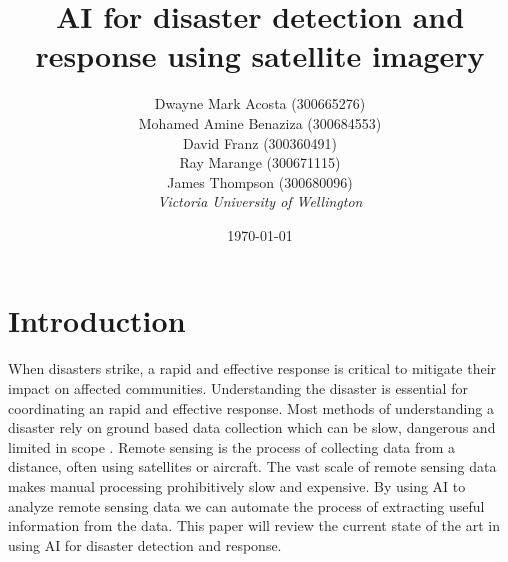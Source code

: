 \documentclass[conference,a4paper]{IEEEtran}
\begin{document}
\newcommand{\cfigure}[2]{%
  \begin{figure}[h]
    \centering
    \texttt{[image: figures/\#1.png]}%
    \caption{#2}%
    \label{fig:#1}%
  \end{figure}%

}
\title{AI for disaster detection and response using satellite imagery}

\author{Dwayne Mark Acosta (300665276) \\ Mohamed Amine Benaziza (300684553) \\ David Franz (300360491) \\ Ray Marange (300671115) \\ James Thompson (300680096)\\
\textit{Victoria University of Wellington}\\}
\date{\today}

\maketitle

\section{Introduction}


When disasters strike, a rapid and effective response is critical to mitigate their impact on affected communities. Understanding the disaster is essential for coordinating an rapid and effective response. Most methods of understanding a disaster rely on ground based data collection which can be slow, dangerous and limited in scope \cite{nhess-21-1431-2021}. Remote sensing is the process of collecting data from a distance, often using satellites or aircraft. The vast scale of remote sensing data makes manual processing prohibitively slow and expensive. By using AI to analyze remote sensing data we can automate the process of extracting useful information from the data. This paper will review the current state of the art in using AI for disaster detection and response.
\end{document}
